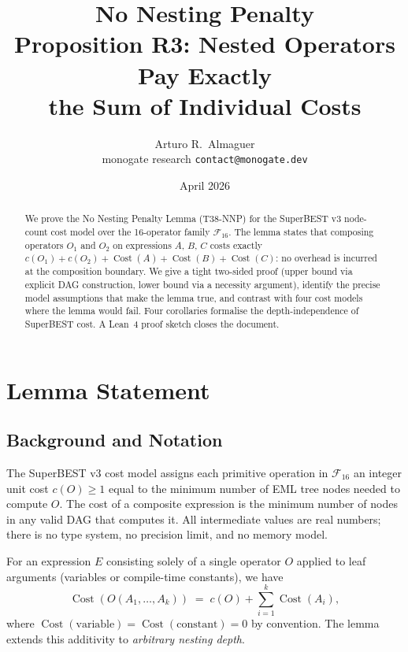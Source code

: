 \documentclass[12pt,a4paper]{article}
\title{No Nesting Penalty\\[6pt]
       \large Proposition R3: Nested Operators Pay Exactly\\
       the Sum of Individual Costs}
\author{Arturo R.\ Almaguer\\
\small monogate research \quad \texttt{contact@monogate.dev}}
\date{April 2026}
\theoremstyle{definition}
\newcommand{\Cost}{\operatorname{Cost}}
\newcommand{\uc}[1]{c(#1)}   %
\begin{document}
\maketitle

\begin{abstract}
We prove the No Nesting Penalty Lemma (T38-NNP) for the SuperBEST v3
node-count cost model over the 16-operator family $\mathcal{F}_{16}$.
The lemma states that composing operators $O_1$ and $O_2$ on expressions
$A$, $B$, $C$ costs exactly $\uc{O_1} + \uc{O_2} + \Cost(A) + \Cost(B)
+ \Cost(C)$: no overhead is incurred at the composition boundary.
We give a tight two-sided proof (upper bound via explicit DAG construction,
lower bound via a necessity argument), identify the precise model assumptions
that make the lemma true, and contrast with four cost models where the lemma
would fail.  Four corollaries formalise the depth-independence of
SuperBEST cost.  A Lean~4 proof sketch closes the document.
\end{abstract}

\tableofcontents
\bigskip

\section{Lemma Statement}
\label{sec:statement}

\subsection{Background and Notation}

The SuperBEST v3 cost model assigns each primitive operation in
$\mathcal{F}_{16}$ an integer unit cost $\uc{O} \geq 1$ equal to the
minimum number of EML tree nodes needed to compute $O$.  The cost of a
composite expression is the minimum number of nodes in any valid DAG that
computes it.  All intermediate values are real numbers; there is no type
system, no precision limit, and no memory model.

For an expression $E$ consisting solely of a single operator $O$ applied
to leaf arguments (variables or compile-time constants), we have
\[
  \Cost(O(A_1, \ldots, A_k)) \;=\; \uc{O} + \sum_{i=1}^{k} \Cost(A_i),
\]
where $\Cost(\text{variable}) = \Cost(\text{constant}) = 0$ by convention.
The lemma extends this additivity to \emph{arbitrary nesting depth}.
\end{document}
